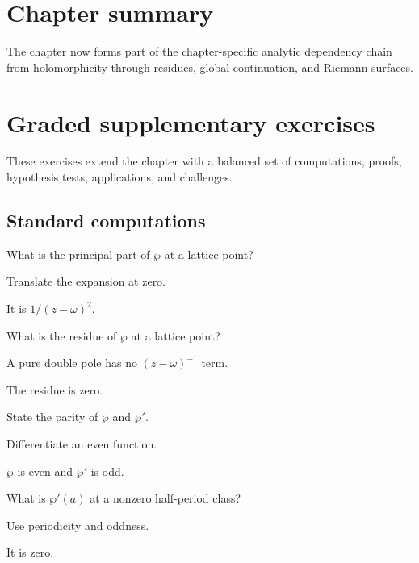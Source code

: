 \section*{Chapter summary}
The chapter now forms part of the chapter-specific analytic dependency chain from holomorphicity through residues, global continuation, and Riemann surfaces.
\section{Graded supplementary exercises}
These exercises extend the chapter with a balanced set of computations, proofs, hypothesis tests, applications, and challenges.

\subsection*{Standard computations}

\begin{exercise}\label{exr:iv29-expand-01}
What is the principal part of \(\wp\) at a lattice point?
\end{exercise}
\begin{hint}
Translate the expansion at zero.
\end{hint}
\begin{solution}
It is \(1/(z-\omega)^2\).
\end{solution}

\begin{exercise}[Residue]\label{exr:iv29-expand-02}
What is the residue of \(\wp\) at a lattice point?
\end{exercise}
\begin{hint}
A pure double pole has no \((z-\omega)^{-1}\) term.
\end{hint}
\begin{solution}
The residue is zero.
\end{solution}

\begin{exercise}[Parity]\label{exr:iv29-expand-03}
State the parity of \(\wp\) and \(\wp'\).
\end{exercise}
\begin{hint}
Differentiate an even function.
\end{hint}
\begin{solution}
\(\wp\) is even and \(\wp'\) is odd.
\end{solution}

\begin{exercise}\label{exr:iv29-expand-04}
What is \(\wp'(a)\) at a nonzero half-period class?
\end{exercise}
\begin{hint}
Use periodicity and oddness.
\end{hint}
\begin{solution}
It is zero.
\end{solution}

